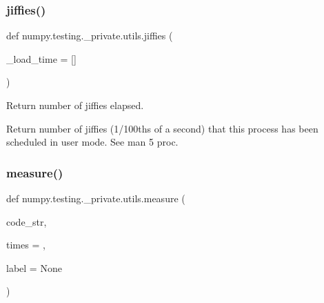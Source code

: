 \subsubsection{\texorpdfstring{jiffies()}{jiffies()}\hspace{0.1cm}{\footnotesize\ttfamily [2/2]}}
{\footnotesize\ttfamily def numpy.\+testing.\+\_\+private.\+utils.\+jiffies (\begin{DoxyParamCaption}\item[{}]{\+\_\+load\+\_\+time = {\ttfamily \mbox{[}\mbox{]}} }\end{DoxyParamCaption})}

\begin{DoxyVerb}Return number of jiffies elapsed.

Return number of jiffies (1/100ths of a second) that this
process has been scheduled in user mode. See man 5 proc.\end{DoxyVerb}
 \mbox{\label{namespacenumpy_1_1testing_1_1__private_1_1utils_aeb40a64ac09b4589ba74fa1de7c188b9}} 
\subsubsection{\texorpdfstring{measure()}{measure()}}
{\footnotesize\ttfamily def numpy.\+testing.\+\_\+private.\+utils.\+measure (\begin{DoxyParamCaption}\item[{}]{code\+\_\+str,  }\item[{}]{times = {},  }\item[{}]{label = {\ttfamily None} }\end{DoxyParamCaption})}

